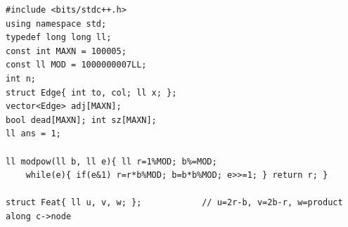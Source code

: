 \begin{lstlisting}[caption={CF 833D: centroid decomposition. Each node carries the additive colour-imbalance features u=2r-b, v=2b-r and the clamminess product w. A 2-D dominance sweep counts partners; the accumulator is a product, combined across arms by modular division. dfs size and find centroid match lst:c18-build. ASCII only}, label={lst:c18-833d}]
#include <bits/stdc++.h>
using namespace std;
typedef long long ll;
const int MAXN = 100005;
const ll MOD = 1000000007LL;
int n;
struct Edge{ int to, col; ll x; };
vector<Edge> adj[MAXN];
bool dead[MAXN]; int sz[MAXN];
ll ans = 1;

ll modpow(ll b, ll e){ ll r=1%MOD; b%=MOD;
    while(e){ if(e&1) r=r*b%MOD; b=b*b%MOD; e>>=1; } return r; }

struct Feat{ ll u, v, w; };            // u=2r-b, v=2b-r, w=product along c->node


\end{lstlisting}
